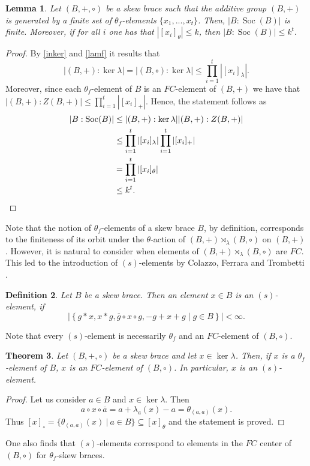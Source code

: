 \documentclass{amsart}
\newcommand{\Soc}{\operatorname{Soc}}
\newtheorem{thm}{Theorem}[section]
\newtheorem{lem}[thm]{Lemma}
\newtheorem{defn}[thm]{Definition}
\begin{document}
\begin{lem}
\label{thetafg}
    Let $(B,+,\circ)$ be a skew brace such that the additive group $(B,+)$ is generated by a finite set of $\theta_f$-elements $\{x_1,...,x_t\}$. Then, $|B:\Soc(B)|$ is finite. Moreover, if for all $i$ one has that $|[x_i]_{\theta}| \leq k$, then $|B:\Soc(B)| \leq k^{t}.$
\end{lem}

\begin{proof}
    By \cref{inker} and \cref{lamf} it results that $$|(B,+):\ker\lambda| =|(B,\circ):\ker\lambda|\leq \prod_{i=1}^t|[x_i]_{\lambda}|.$$ Moreover, since each $\theta_f$-element of $B$ is an $FC$-element of $(B,+)$ we have that $|(B,+):Z(B,+)|\leq \prod_{i=1}^t|[x_i]_{+}|$. Hence, the statement follows as \begin{align*} | B : \Soc(B)| &\leq |(B,+):\ker \lambda| |(B,+):Z(B,+)|\\  
    &\leq \prod_{i=1}^t|[x_i]_{\lambda}| \prod_{i=1}^t|[x_i]_{+}|\\ 
    &=\prod_{i=1}^t|[x_i]_{\theta}|\\
    &\leq k^t.\qedhere\end{align*} 
\end{proof}

Note that the notion of $\theta_f$-elements of a skew brace $B$, by definition, corresponds to the finiteness of its orbit under the $\theta$-action of $(B,+)\rtimes_{\lambda}(B,\circ)$ on $(B,+)$. However, it is natural to consider when elements of $(B,+)\rtimes_{\lambda}(B,\circ)$ are $FC$. This led to the introduction of $(s)$-elements by Colazzo, Ferrara and Trombetti \cite{s}. 

\begin{defn}
    Let $B$ be a skew  brace. Then an element $x \in B$ is an $(s)$-element, if $$ |\left\lbrace g*x ,x*g, \overline{g} \circ x \circ g, -g+x+g \mid g \in B\right\rbrace| < \infty.$$
\end{defn}
Note that every $(s)$-element is necessarily $\theta_f$ and an $FC$-element of $(B,\circ)$. 
\begin{thm}
    Let $(B,+,\circ)$ be a skew  brace and let $x\in \ker\lambda$. Then, if $x$ is a $\theta_f$-element of $B$, $x$ is an $FC$-element of $(B,\circ)$. In particular, $x$ is an $(s)$-element.  
\end{thm}
\begin{proof}
        Let us consider $a\in B$ and $x\in \ker\lambda$. Then 
        \[
        a\circ x \circ \overline{a}
        =a+\lambda_a(x)-a
        =\theta_{(a,a)}(x).
        \]
        Thus $[x]_\circ=\{\theta_{(a,a)}(x) \ | \ a\in B\}\subseteq [x]_\theta$
        and the statement is proved.
\end{proof}
One also finds that $(s)$-elements correspond to elements in the $FC$ center of $(B,\circ)$ for $\theta_f$-skew braces.
\end{document}
